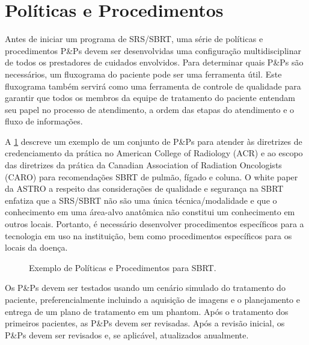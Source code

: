 \documentclass[11pt,a4paper]{article}
\newcounter{exemplo}
\begin{document}
\section{Políticas e Procedimentos}

	Antes de iniciar um programa de SRS/SBRT, uma série de políticas e procedimentos P\&Ps devem ser desenvolvidas uma configuração multidisciplinar de todos os prestadores de cuidados envolvidos. Para determinar quais P\&Ps são necessários, um fluxograma do paciente pode ser uma ferramenta útil. Este fluxograma também servirá como uma ferramenta de controle de qualidade para garantir que todos os membros da equipe de tratamento do paciente entendam seu papel no processo de atendimento, a ordem das etapas do atendimento e o fluxo de informações.

	A \ref{fig:srsPop} descreve um exemplo de um conjunto de P\&Ps para atender às diretrizes de credenciamento da prática no American College of Radiology (ACR) e ao escopo das diretrizes da prática da Canadian Association of Radiation Oncologists (CARO) para recomendações SBRT de pulmão, fígado e coluna. O white paper da ASTRO a respeito das considerações de qualidade e segurança na SBRT enfatiza que a SRS/SBRT não são uma única técnica/modalidade e que o conhecimento em uma área-alvo anatômica não constitui um conhecimento em outros locais. Portanto, é necessário desenvolver procedimentos específicos para a tecnologia em uso na instituição, bem como procedimentos específicos para os locais da doença.

	\begin{figure}[h]
		\centering
		\caption{Exemplo de Políticas e Procedimentos para SBRT.}
		\label{fig:srsPop}
	\end{figure}

	Os P\&Ps devem ser testados usando um cenário simulado do tratamento do paciente, preferencialmente incluindo a aquisição de imagens e o planejamento e entrega de um plano de tratamento em um phantom. Após o tratamento dos primeiros pacientes, as P\&Ps devem ser revisadas. Após a revisão inicial, os P\&Ps devem ser revisados e, se aplicável, atualizados anualmente.
\end{document}
